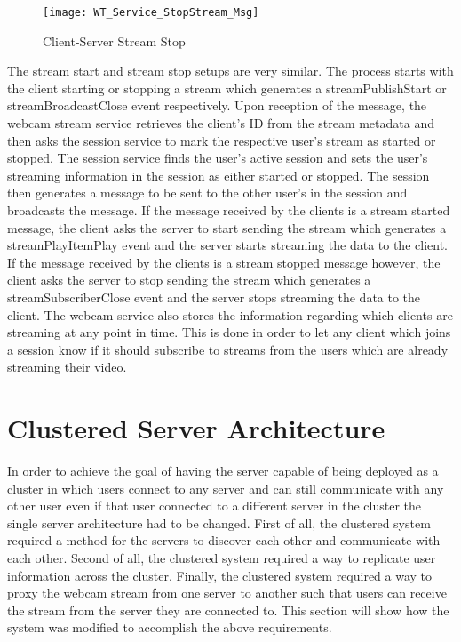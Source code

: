 \begin{figure}
	\centering
	\texttt{[image: WT\_Service\_StopStream\_Msg]}
	\caption{Client-Server Stream Stop}
	\label{fig:sessstreamstop}
\end{figure}

The stream start and stream stop setups are very similar. The process starts with the client starting or stopping a stream which generates a streamPublishStart or streamBroadcastClose event respectively. Upon reception of the message, the webcam stream service retrieves the client's ID from the stream metadata and then asks the session service to mark the respective user's stream as started or stopped. The session service finds the user's active session and sets the user's streaming information in the session as either started or stopped. The session then generates a message to be sent to the other user's in the session and broadcasts the message. If the message received by the clients is a stream started message, the client asks the server to start sending the stream which generates a streamPlayItemPlay event and the server starts streaming the data to the client. If the message received by the clients is a stream stopped message however, the client asks the server to stop sending the stream which generates a streamSubscriberClose event and the server stops streaming the data to the client. The webcam service also stores the information regarding which clients are streaming at any point in time. This is done in order to let any client which joins a session know if it should subscribe to streams from the users which are already streaming their video.

\section{Clustered Server Architecture}

In order to achieve the goal of having the server capable of being deployed as a cluster in which users connect to any server and can still communicate with any other user even if that user connected to a different server in the cluster the single server architecture had to be changed. First of all, the clustered system required a method for the servers to discover each other and communicate with each other. Second of all, the clustered system required a way to replicate user information across the cluster. Finally, the clustered system required a way to proxy the webcam stream from one server to another such that users can receive the stream from the server they are connected to. This section will show how the system was modified to accomplish the above requirements.

